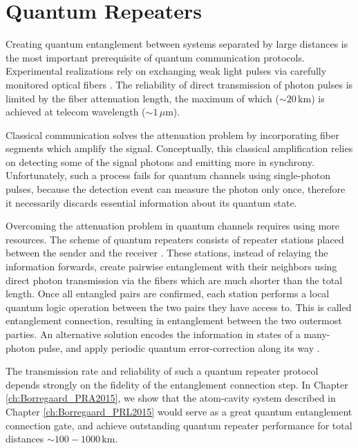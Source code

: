 \section{Quantum Repeaters}
Creating quantum entanglement between systems separated by
large distances is the most important prerequisite of quantum communication
protocols. Experimental realizations rely on exchanging weak light pulses
via carefully monitored optical fibers \cite{Peev2009}. The
reliability of direct transmission of photon pulses is limited by the
fiber attenuation length, the maximum of which ($\sim 20\,\mathrm{km}$) is
achieved at telecom wavelength ($\sim 1\,\mu\mathrm{m}$).

Classical communication solves the attenuation problem by incorporating fiber
segments which amplify the signal. Conceptually, this classical amplification
relies on detecting some of the signal photons and emitting more in synchrony.
Unfortunately, such a process fails for quantum channels using single-photon
pulses, because the detection event can measure the photon only once,
therefore it necessarily discards essential information about its quantum state.

Overcoming the attenuation problem in quantum channels requires using more
resources. The scheme of quantum repeaters consists of repeater stations placed
between the sender and the receiver \cite{bennett2, bennett, duan3}.
These stations, instead of relaying the information forwards, create pairwise
entanglement with their neighbors using direct photon transmission via the
fibers which are much shorter than the total length. Once all entangled pairs
are confirmed, each station performs a local quantum logic operation between the two
pairs they have access to. This is called entanglement connection, resulting in
entanglement between the two outermost parties. An alternative solution 
encodes the information in states of a many-photon pulse, and apply periodic
quantum error-correction along its way \cite{Muralidharan2015}.

The transmission rate  and reliability of such a quantum repeater protocol
depends strongly on the fidelity of the entanglement connection step. In Chapter
\ref{ch:Borregaard_PRA2015}, we show that the atom-cavity system described
in Chapter \ref{ch:Borregaard_PRL2015} would serve as a great quantum
entanglement connection gate, and achieve outstanding quantum repeater
performance for total distances $\sim 100-1000\,\mathrm{km}$.



